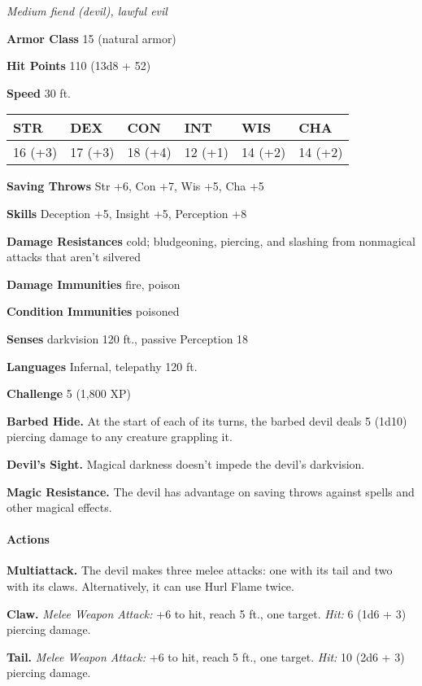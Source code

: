 \documentclass[
]{article}
\begin{document}
\emph{Medium fiend (devil), lawful evil}

\textbf{Armor Class} 15 (natural armor)

\textbf{Hit Points} 110 (13d8 + 52)

\textbf{Speed} 30 ft.

\begin{longtable}[]{@{}llllll@{}}
\toprule
STR & DEX & CON & INT & WIS & CHA\tabularnewline
\midrule
\endhead
16 (+3) & 17 (+3) & 18 (+4) & 12 (+1) & 14 (+2) & 14 (+2)\tabularnewline
\bottomrule
\end{longtable}

\textbf{Saving Throws} Str +6, Con +7, Wis +5, Cha +5

\textbf{Skills} Deception +5, Insight +5, Perception +8

\textbf{Damage Resistances} cold; bludgeoning, piercing, and slashing
from nonmagical attacks that aren't silvered

\textbf{Damage Immunities} fire, poison

\textbf{Condition Immunities} poisoned

\textbf{Senses} darkvision 120 ft., passive Perception 18

\textbf{Languages} Infernal, telepathy 120 ft.

\textbf{Challenge} 5 (1,800 XP)

\textbf{Barbed Hide.} At the start of each of its turns, the barbed
devil deals 5 (1d10) piercing damage to any creature grappling it.

\textbf{Devil's Sight.} Magical darkness doesn't impede the devil's
darkvision.

\textbf{Magic Resistance.} The devil has advantage on saving throws
against spells and other magical effects.

\hypertarget{actions-9}{%
\paragraph{Actions}\label{actions-9}}

\textbf{Multiattack.} The devil makes three melee attacks: one with its
tail and two with its claws. Alternatively, it can use Hurl Flame twice.

\textbf{Claw.} \emph{Melee Weapon Attack:} +6 to hit, reach 5 ft., one
target. \emph{Hit:} 6 (1d6 + 3) piercing damage.

\textbf{Tail.} \emph{Melee Weapon Attack:} +6 to hit, reach 5 ft., one
target. \emph{Hit:} 10 (2d6 + 3) piercing damage.
\end{document}
